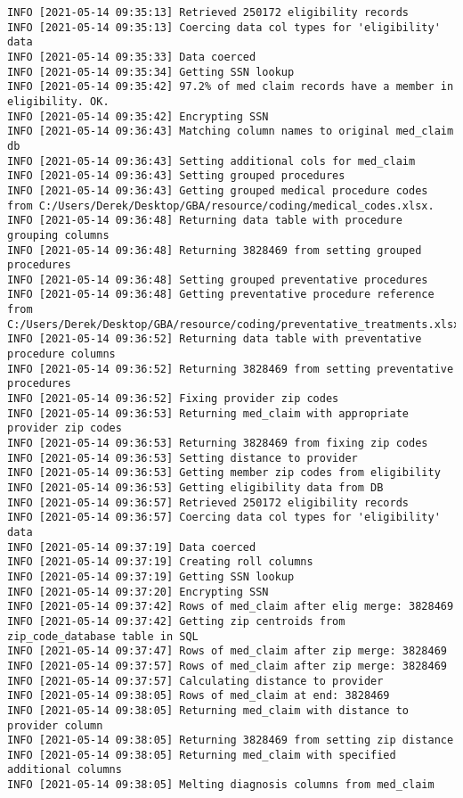 \documentclass[
]{book}
\begin{document}
\begin{verbatim}
INFO [2021-05-14 09:35:13] Retrieved 250172 eligibility records
INFO [2021-05-14 09:35:13] Coercing data col types for 'eligibility' data
INFO [2021-05-14 09:35:33] Data coerced
INFO [2021-05-14 09:35:34] Getting SSN lookup
INFO [2021-05-14 09:35:42] 97.2% of med claim records have a member in eligibility. OK.
INFO [2021-05-14 09:35:42] Encrypting SSN
INFO [2021-05-14 09:36:43] Matching column names to original med_claim db
INFO [2021-05-14 09:36:43] Setting additional cols for med_claim
INFO [2021-05-14 09:36:43] Setting grouped procedures
INFO [2021-05-14 09:36:43] Getting grouped medical procedure codes from C:/Users/Derek/Desktop/GBA/resource/coding/medical_codes.xlsx.
INFO [2021-05-14 09:36:48] Returning data table with procedure grouping columns
INFO [2021-05-14 09:36:48] Returning 3828469 from setting grouped procedures
INFO [2021-05-14 09:36:48] Setting grouped preventative procedures
INFO [2021-05-14 09:36:48] Getting preventative procedure reference from C:/Users/Derek/Desktop/GBA/resource/coding/preventative_treatments.xlsx
INFO [2021-05-14 09:36:52] Returning data table with preventative procedure columns
INFO [2021-05-14 09:36:52] Returning 3828469 from setting preventative procedures
INFO [2021-05-14 09:36:52] Fixing provider zip codes
INFO [2021-05-14 09:36:53] Returning med_claim with appropriate provider zip codes
INFO [2021-05-14 09:36:53] Returning 3828469 from fixing zip codes
INFO [2021-05-14 09:36:53] Setting distance to provider
INFO [2021-05-14 09:36:53] Getting member zip codes from eligibility
INFO [2021-05-14 09:36:53] Getting eligibility data from DB
INFO [2021-05-14 09:36:57] Retrieved 250172 eligibility records
INFO [2021-05-14 09:36:57] Coercing data col types for 'eligibility' data
INFO [2021-05-14 09:37:19] Data coerced
INFO [2021-05-14 09:37:19] Creating roll columns
INFO [2021-05-14 09:37:19] Getting SSN lookup
INFO [2021-05-14 09:37:20] Encrypting SSN
INFO [2021-05-14 09:37:42] Rows of med_claim after elig merge: 3828469
INFO [2021-05-14 09:37:42] Getting zip centroids from zip_code_database table in SQL
INFO [2021-05-14 09:37:47] Rows of med_claim after zip merge: 3828469
INFO [2021-05-14 09:37:57] Rows of med_claim after zip merge: 3828469
INFO [2021-05-14 09:37:57] Calculating distance to provider
INFO [2021-05-14 09:38:05] Rows of med_claim at end: 3828469
INFO [2021-05-14 09:38:05] Returning med_claim with distance to provider column
INFO [2021-05-14 09:38:05] Returning 3828469 from setting zip distance
INFO [2021-05-14 09:38:05] Returning med_claim with specified additional columns
INFO [2021-05-14 09:38:05] Melting diagnosis columns from med_claim

\end{verbatim}
\end{document}
